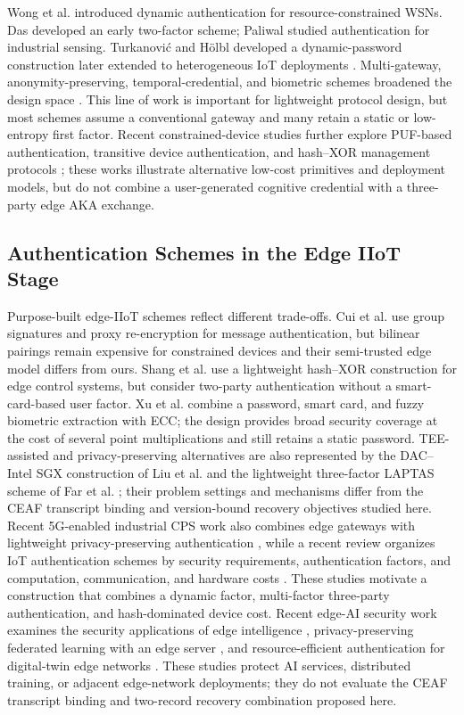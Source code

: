 \documentclass[cmc,article,submit,moreauthors,pdftex]{Definitions/tsp}
\begin{document}
Wong et al. \cite{wong} introduced dynamic authentication for resource-constrained WSNs. Das \cite{das} developed an early two-factor scheme; Paliwal \cite{paliwal} studied authentication for industrial sensing. Turkanovi\'c and H\"olbl \cite{turkanovic2013} developed a dynamic-password construction later extended to heterogeneous IoT deployments \cite{turkanovic2014}. Multi-gateway, anonymity-preserving, temporal-credential, and biometric schemes broadened the design space \cite{amin,jiang,li2018threefactor}. This line of work is important for lightweight protocol design, but most schemes assume a conventional gateway and many retain a static or low-entropy first factor. Recent constrained-device studies further explore PUF-based authentication, transitive device authentication, and hash--XOR management protocols \cite{luo2022puf,krishnasrija2023transitive,cetintav2023iot}; these works illustrate alternative low-cost primitives and deployment models, but do not combine a user-generated cognitive credential with a three-party edge AKA exchange.

\subsection{Authentication Schemes in the Edge IIoT Stage}

Purpose-built edge-IIoT schemes reflect different trade-offs. Cui et al. \cite{cui} use group signatures and proxy re-encryption for message authentication, but bilinear pairings remain expensive for constrained devices and their semi-trusted edge model differs from ours. Shang et al. \cite{shang} use a lightweight hash--XOR construction for edge control systems, but consider two-party authentication without a smart-card-based user factor. Xu et al. \cite{xu} combine a password, smart card, and fuzzy biometric extraction with ECC; the design provides broad security coverage at the cost of several point multiplications and still retains a static password. TEE-assisted and privacy-preserving alternatives are also represented by the DAC--Intel SGX construction of Liu et al. \cite{liu2021sgx} and the lightweight three-factor LAPTAS scheme of Far et al. \cite{far}; their problem settings and mechanisms differ from the CEAF transcript binding and version-bound recovery objectives studied here. Recent 5G-enabled industrial CPS work also combines edge gateways with lightweight privacy-preserving authentication \cite{xiang2024icps}, while a recent review organizes IoT authentication schemes by security requirements, authentication factors, and computation, communication, and hardware costs \cite{cetintav2025review}. These studies motivate a construction that combines a dynamic factor, multi-factor three-party authentication, and hash-dominated device cost. Recent edge-AI security work examines the security applications of edge intelligence \cite{mohamed2023edge}, privacy-preserving federated learning with an edge server \cite{xu2024secfl}, and resource-efficient authentication for digital-twin edge networks \cite{wang2025read}. These studies protect AI services, distributed training, or adjacent edge-network deployments; they do not evaluate the CEAF transcript binding and two-record recovery combination proposed here.
\end{document}
